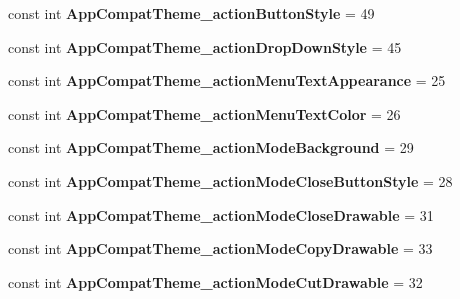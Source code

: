 \begin{DoxyCompactItemize}
\item 
\mbox{\label{classXaria_1_1Resource_1_1Styleable_af7c8e7fa790ddb3df23e6fde328ee36a}} 
const int {\bfseries App\+Compat\+Theme\+\_\+action\+Button\+Style} = 49
\item 
\mbox{\label{classXaria_1_1Resource_1_1Styleable_ad4167787605ac48bbe495a9a3e79d844}} 
const int {\bfseries App\+Compat\+Theme\+\_\+action\+Drop\+Down\+Style} = 45
\item 
\mbox{\label{classXaria_1_1Resource_1_1Styleable_abb7f9dc40dac0eb88efc2ea2535140dd}} 
const int {\bfseries App\+Compat\+Theme\+\_\+action\+Menu\+Text\+Appearance} = 25
\item 
\mbox{\label{classXaria_1_1Resource_1_1Styleable_a379e0f0e7138d25701c209a7e0dcb126}} 
const int {\bfseries App\+Compat\+Theme\+\_\+action\+Menu\+Text\+Color} = 26
\item 
\mbox{\label{classXaria_1_1Resource_1_1Styleable_ae4828ae2a5daf84f535287343f160602}} 
const int {\bfseries App\+Compat\+Theme\+\_\+action\+Mode\+Background} = 29
\item 
\mbox{\label{classXaria_1_1Resource_1_1Styleable_a51c39e1948db9f0302f5d1c1ab5a1ca5}} 
const int {\bfseries App\+Compat\+Theme\+\_\+action\+Mode\+Close\+Button\+Style} = 28
\item 
\mbox{\label{classXaria_1_1Resource_1_1Styleable_ae894f187f860ae2b27601eea665bd224}} 
const int {\bfseries App\+Compat\+Theme\+\_\+action\+Mode\+Close\+Drawable} = 31
\item 
\mbox{\label{classXaria_1_1Resource_1_1Styleable_a522b255218dae728ebe6eb134f421f62}} 
const int {\bfseries App\+Compat\+Theme\+\_\+action\+Mode\+Copy\+Drawable} = 33
\item 
\mbox{\label{classXaria_1_1Resource_1_1Styleable_a19ffdb7cc32872583abbf0275424365f}} 
const int {\bfseries App\+Compat\+Theme\+\_\+action\+Mode\+Cut\+Drawable} = 32

\end{DoxyCompactItemize}
